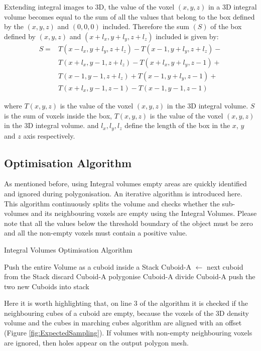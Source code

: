 \documentclass{subfiles}
\begin{document}
Extending integral images to 3D, the value of the voxel $(x ,y, z)$ in a 3D integral volume becomes equal to the sum of all the values that belong to the box defined by the $(x, y, z)$ and $(0, 0, 0)$ included. 
Therefore the sum $(S)$ of the box defined by $(x, y, z)$ and $(x+l_x, y+l_y, z+l_z)$ included is given by:
\begin{equation}
\begin{split}
S = & T(x-l_x,y+l_y,z+l_z) - 
T(x-1,y+l_y,z+l_z) - \\
&  T(x+l_x,y-1,z+l_z) - 	
T(x+l_x,y+l_y,z-1) + \\
&  T(x-1,y-1,z+l_z)   +
T(x-1,y+l_y,z-1)   +  \\
&  T(x+l_x,y-1,z-1)   -
T(x-1,y-1,z-1)
\end{split}
\end{equation}

where 	$T(x, y, z)$ is the value of the voxel $(x, y, z)$ in the 3D integral volume.  
$S$ is the sum of voxels inside the box, $T(x, y, z)$ is the value of the voxel $(x, y, z)$ in the 3D integral volume. and $l_x, l_y, l_z$ define the length of the box in the $x$, $y$ and $z$ axis respectively. 



\subsection{Optimisation Algorithm}\label{sec:IVoptApproach}
As mentioned before, using Integral volumes empty areas are quickly identified and ignored during polygonisation. An iterative algorithm is introduced here. This algorithm continuously splits the volume and checks whether the sub-volumes and its neighbouring voxels are empty using the Integral Volumes. Please note that all the values below the threshold boundary of the object must be zero and all the non-empty voxels must contain a positive value.  

\begin{algorithm}
	\caption{Integral Volumes Optimisation Algorithm}
	\label{alg:IVoptSimple}
	\centering
	\begin{algorithmic}[1]
		\State Push the entire Volume as a cuboid inside a Stack
		\State Cuboid-A   $\gets$  next cuboid from the Stack 
		\State	discard Cuboid-A
		\State polygonise Cuboid-A
		\Else 
		\State divide Cuboid-A
		\State push the two new Cuboids into stack
		\EndIf
		\EndWhile
	\end{algorithmic}
\end{algorithm}
Here it is worth highlighting that, on line 3 of the algorithm it is checked if the neighbouring cubes of a cuboid are empty, because the voxels of the 3D density volume and the cubes in marching cubes algorithm are  aligned with an offset (Figure \ref{fig:ExpectedSampling}). If volumes with non-empty neighbouring voxels are ignored, then holes appear on the output polygon mesh. 		
\end{document}
